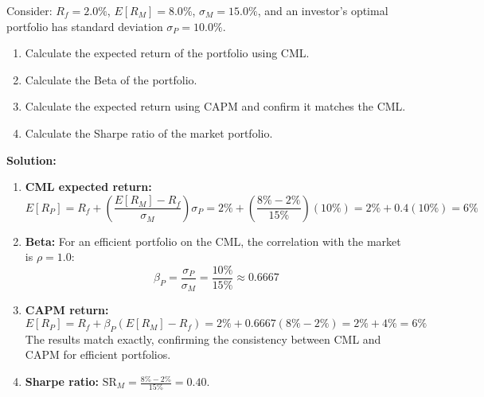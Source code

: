 \begin{tcolorbox}[
	colback=gray!5!white,
	colframe=black!15!white,
	boxrule=0.5pt,
	arc=3pt,
	title=\textbf{Knowledge Check: The Capital Asset Pricing Model},
	coltitle=black,
	colbacktitle=black!5!white,
	before skip=6pt,
	after skip=6pt,
	breakable
]
Consider: $R_f = 2.0\%$, $E[R_M] = 8.0\%$, $\sigma_M = 15.0\%$, and an investor's optimal portfolio has standard deviation $\sigma_P = 10.0\%$.
\begin{enumerate}
	\item Calculate the expected return of the portfolio using CML.
	\item Calculate the Beta of the portfolio.
	\item Calculate the expected return using CAPM and confirm it matches the CML.
	\item Calculate the Sharpe ratio of the market portfolio.
\end{enumerate}
\textbf{Solution:}
\begin{enumerate}
	\item \textbf{CML expected return:}
	      \[
	      E[R_P] = R_f + \left(\frac{E[R_M] - R_f}{\sigma_M}\right) \sigma_P = 2\% + \left(\frac{8\% - 2\%}{15\%}\right)(10\%) = 2\% + 0.4(10\%) = 6\%
	      \]
	\item \textbf{Beta:} For an efficient portfolio on the CML, the correlation with the market is $\rho = 1.0$:
	      \[
	      \beta_P = \frac{\sigma_P}{\sigma_M} = \frac{10\%}{15\%} \approx 0.6667
	      \]
	\item \textbf{CAPM return:}
	      \[
	      E[R_P] = R_f + \beta_P (E[R_M] - R_f) = 2\% + 0.6667(8\% - 2\%) = 2\% + 4\% = 6\%
	      \]
	      The results match exactly, confirming the consistency between CML and CAPM for efficient portfolios.
	\item \textbf{Sharpe ratio:} $\text{SR}_M = \frac{8\% - 2\%}{15\%} = 0.40$.
\end{enumerate}
\end{tcolorbox}
